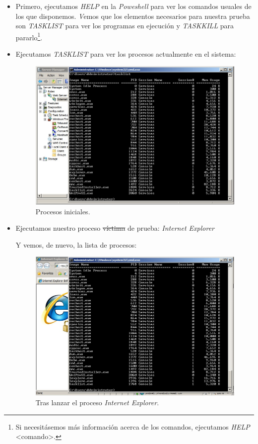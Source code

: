\documentclass[paper=a4, fontsize=11pt]{scrartcl} %
\numberwithin{equation}{section} %
\numberwithin{figure}{section} %
\numberwithin{table}{section} %
\begin{document}
\begin{enumerate}
		\begin{itemize}
			\item Primero, ejecutamos \textit{HELP} en la \textit{Poweshell} para ver los comandos
			usuales de los que disponemos.
			\textit Vemos que los elementos necesarios para nuestra prueba son \textit{TASKLIST} para
			ver los programas en ejecución y \textit{TASKKILL} para pararlo\footnote{Si necesitásemos
			más información acerca de los comandos, ejecutamos \textit{HELP} <comando>.}.
			\item Ejecutamos \textit{TASKLIST} para ver los procesos actualmente en el sistema:
			
			\begin{figure}[H]
				\centering
				\includegraphics[width=15cm]{Ejercicio_25a.jpg}
				\caption{Procesos iniciales.}
				\label{fig:list}
			\end{figure}
			
			\item Ejecutamos nuestro proceso \sout{víctima} de prueba: \textit{Internet Explorer}
			
			Y vemos, de nuevo, la lista de procesos:
			
			\begin{figure}[H]
				\centering
				\includegraphics[width=15cm]{Ejercicio_25b.jpg}
				\caption{Tras lanzar el proceso \textit{Internet Explorer}.}
				\label{fig:born}
			\end{figure}
			

\end{itemize}
\end{enumerate}
\end{document}
